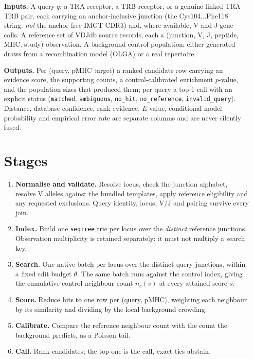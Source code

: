\documentclass[10pt,a4paper]{article}
\theoremstyle{definition}
\newcommand{\code}[1]{\texttt{\small #1}}
\begin{document}
\textbf{Inputs.} A query $q$: a TRA receptor, a TRB receptor, or a genuine linked TRA--TRB pair,
each carrying an anchor-inclusive junction (the Cys104$\ldots$Phe118 string, \emph{not} the
anchor-free IMGT CDR3) and, where available, V and J gene calls. A reference set of VDJdb source
records, each a (junction, V, J, peptide, MHC, study) observation. A background control population:
either generated draws from a recombination model (OLGA) or a real repertoire.

\textbf{Outputs.} Per (query, pMHC target) a ranked candidate row carrying an evidence score, the
supporting counts, a control-calibrated enrichment $p$-value, and the population sizes that produced
them; per query a top-1 call with an explicit status (\code{matched}, \code{ambiguous},
\code{no\_hit}, \code{no\_reference}, \code{invalid\_query}). Distance, database confidence, rank
evidence, $E$-value, conditional model probability and empirical error rate are separate columns and
are never silently fused.

\section{Stages}
\begin{enumerate}\setlength{\itemsep}{1pt}
\item \textbf{Normalise and validate.} Resolve locus, check the junction alphabet, resolve V alleles
  against the bundled templates, apply reference eligibility and any requested exclusions. Query
  identity, locus, V/J and pairing survive every join.
\item \textbf{Index.} Build one \texttt{seqtree} trie per locus over the \emph{distinct} reference
  junctions. Observation multiplicity is retained separately; it must not multiply a search key.
\item \textbf{Search.} One native batch per locus over the distinct query junctions, within a fixed
  edit budget $\theta$. The same batch runs against the control index, giving the cumulative control
  neighbour count $n_c(s)$ at every attained score $s$.
\item \textbf{Score.} Reduce hits to one row per (query, pMHC), weighting each neighbour by its
  similarity and dividing by the local background crowding.
\item \textbf{Calibrate.} Compare the reference neighbour count with the count the background
  predicts, as a Poisson tail.
\item \textbf{Call.} Rank candidates; the top one is the call, exact ties abstain.
\end{enumerate}
\end{document}
